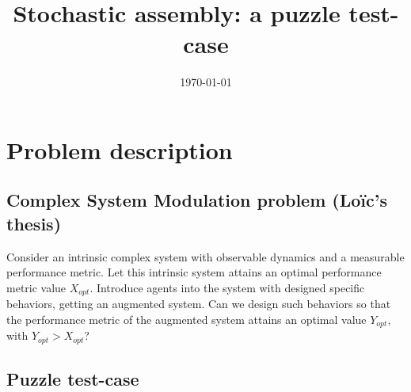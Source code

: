 \documentclass[letterpaper, oneside]{article}
\title{Stochastic assembly: a puzzle test-case}
\date{\today}
\author{\loic \and \spring}
\begin{document}
\maketitle

% 
% 
% 
% 


\section{Problem description} %
\label{sec:problem_description}

\subsection{Complex System Modulation problem (Loïc's thesis)} %
\label{sub:underlying_problem}
Consider an intrinsic complex system with observable dynamics and a measurable performance metric. Let this intrinsic system attains an optimal performance metric value $X_{opt}$. Introduce agents into the system with designed specific behaviors, getting an augmented system. Can we design such behaviors so that the performance metric of the augmented system attains an optimal value $Y_{opt}$, with $Y_{opt} > X_{opt}$?

\subsection{Puzzle test-case} %
\label{sub:puzzle_test_case}
\end{document}
